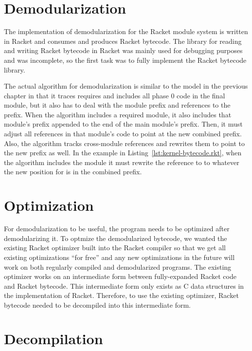 \section{Demodularization}

The implementation of demodularization for the Racket module system is written in Racket and consumes and produces Racket bytecode.
The library for reading and writing Racket bytecode in Racket was mainly used for debugging purposes and was incomplete, so the first task was to fully implement the Racket bytecode library.

The actual algorithm for demodularization is similar to the model in the previous chapter in that it traces requires and includes all phase 0 code in the final module, but it also has to deal with the module prefix and references to the prefix.
When the algorithm includes a required module, it also includes that module's prefix appended to the end of the main module's prefix. 
Then, it must adjust all references in that module's code to point at the new combined prefix.
Also, the algorithm tracks cross-module references and rewrites them to point to the new prefix as well.
In the example in Listing~\ref{lst:kernel-bytecode.rkt}, when the algorithm includes the module  it must rewrite the reference to  to whatever the new position for  is in the combined prefix.

\section{Optimization}

For demodularization to be useful, the program needs to be optimized after demodularizing it.
To optmize the demodularized bytecode, we wanted the existing Racket optimizer built into the Racket compiler so that we get all existing optimizations ``for free'' and any new optimizations in the future will work on both regularly compiled and demodularized programs.
The existing optimizer works on an intermediate form between fully-expanded Racket code and Racket bytecode.
This intermediate form only exists as C data structures in the implementation of Racket.
Therefore, to use the existing optimizer, Racket bytecode needed to be decompiled into this intermediate form. 

\section{Decompilation}

